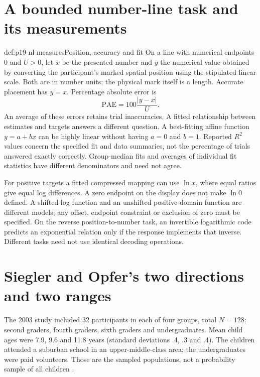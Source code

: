 \section{A bounded number-line task and its measurements}
\label{sec:p19-nl-task}

\begin{hbdefinition}{def:p19-nl-measures}{Position, accuracy and fit}
On a line with numerical endpoints 0 and \(U>0\), let \(x\) be the
presented number and \(y\) the numerical value obtained by converting
the participant's marked spatial position using the stipulated linear
scale. Both are in number units; the physical mark itself is a length.
Accurate placement has \(y=x\). Percentage absolute error is
\[
 \mathrm{PAE}=100\frac{|y-x|}{U}.
\]
An average of these errors retains trial inaccuracies. A fitted
relationship between estimates and targets answers a different question.
A best-fitting affine function \(y=a+bx\) can be highly linear without
having \(a=0\) and \(b=1\). Reported \(R^2\) values concern the
specified fit and data summaries, not the percentage of trials answered
exactly correctly. Group-median fits and averages of individual fit
statistics have different denominators and need not agree.
\end{hbdefinition}

For positive targets a fitted compressed mapping can use \(\ln x\),
where equal ratios give equal log differences. A zero endpoint on the
display does not make \(\ln0\) defined. A shifted-log function and an
unshifted positive-domain function are different models; any offset,
endpoint constraint or exclusion of zero must be specified. On the
reverse position-to-number task, an invertible logarithmic code predicts
an exponential relation only if the response implements that inverse.
Different tasks need not use identical decoding operations.

\section{Siegler and Opfer's two directions and two ranges}
\label{sec:p19-nl-siegler-opfer}

The 2003 study included 32 participants in each of four groups, total
\(N=128\): second graders, fourth graders, sixth graders and
undergraduates. Mean child ages were 7.9, 9.6 and 11.8 years
(standard deviations .4, .3 and .4). The children attended a suburban
school in an upper-middle-class area; the undergraduates were paid
volunteers. Those are the sampled populations, not a probability sample
of all children \cite[pp.~238--239]{SieglerOpfer2003EstimationNL}.

